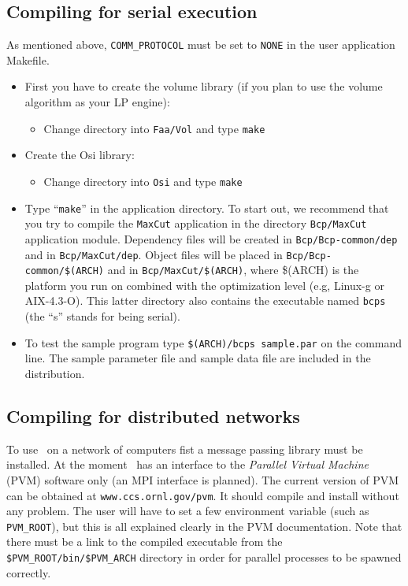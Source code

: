 \subsection{Compiling for serial execution}

As mentioned above, {\tt COMM\_PROTOCOL} must be set to {\tt NONE} in the user
application Makefile. 

\begin{itemize}
\item First you have to create the volume library (if you plan to use the
  volume algorithm as your LP engine):
  \begin{itemize}
  \item Change directory into {\tt Faa/Vol} and type {\tt make}
  \end{itemize}
\item Create the Osi library:
  \begin{itemize}
  \item Change directory into {\tt Osi} and type {\tt make}
  \end{itemize}
\item Type ``{\tt make}'' in the application directory. To
  start out, we recommend that you try to compile the {\tt MaxCut}
  application in the directory {\tt Bcp/MaxCut}
  application module. Dependency files will be created in 
  {\tt Bcp/Bcp-common/dep} and in 
  {\tt Bcp/MaxCut/dep}. Object files will be placed in 
  {\tt Bcp/Bcp-common/\$(ARCH)} and in 
  {\tt Bcp/MaxCut/\$(ARCH)}, where \$(ARCH) is the platform you
  run on combined with the optimization level (e.g, Linux-g or AIX-4.3-O).
  This latter directory also contains the executable named {\tt bcps} (the
  ``s'' stands for being serial).
\item To test the sample program type {\tt \$(ARCH)/bcps sample.par} on the
  command line. The sample parameter file and sample data file are included 
  in the distribution.
\end{itemize}

\subsection{Compiling for distributed networks}

To use \BB\ on a network of computers fist a message passing library must be
installed. At the moment \BB\ has an interface to the 
{\em Parallel Virtual Machine} (PVM) software only (an MPI interface is
planned). The current version of PVM can be obtained at 
{\tt www.ccs.ornl.gov/pvm}. It should compile and install without 
any problem. The user will have to set a few environment variable (such as 
{\tt PVM\_ROOT}), but this is all explained clearly in the PVM
documentation. Note that there must be a link to the compiled executable
from the {\tt \$PVM\_ROOT/bin/\$PVM\_ARCH} directory in order for
parallel processes to be spawned correctly.


